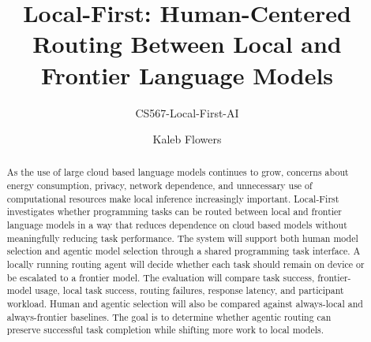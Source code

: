 \documentclass[sigconf,nonacm]{acmart}
\begin{document}
\title{Local-First: Human-Centered  Routing Between Local and Frontier Language Models}
\subtitle{CS567-Local-First-AI}
\author{Kaleb Flowers}

\renewcommand{\shortauthors}{CS567-Local-First-AI}

\begin{abstract}
As the use of large cloud based language models continues to grow, concerns about energy consumption, privacy, network dependence, and unnecessary use of computational resources make local inference increasingly important. Local-First investigates whether programming tasks can be routed between local and frontier language models in a way that reduces dependence on cloud based models without meaningfully reducing task performance. The system will support both human model selection and agentic model selection through a shared programming task interface. A locally running routing agent will decide whether each task should remain on device or be escalated to a frontier model. The evaluation will compare task success, frontier-model usage, local task success, routing failures, response latency, and participant workload. Human and agentic selection will also be compared against always-local and always-frontier baselines. The goal is to determine whether agentic routing can preserve successful task completion while shifting more work to local models.
\end{abstract}


\maketitle


\end{document}
